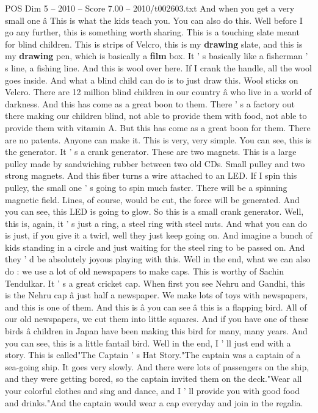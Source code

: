 \begin{textsample}{POS Dim 5 – 2010 – Score 7.00 – 2010/t002603.txt}
And when you get a very small one â This is what the kids teach you.
You can also do this.
Well before I go any further, this is something worth sharing.
This is a touching slate meant for blind children.
This is strips of Velcro, this is my \textbf{drawing} slate, and this is my \textbf{drawing} pen, which is basically a \textbf{film} box.
It ' s basically like a fisherman ' s line, a fishing line.
And this is wool over here.
If I crank the handle, all the wool goes inside.
And what a blind child can do is to just draw this.
Wool sticks on Velcro.
There are 12 million blind children in our country â who live in a world of darkness.
And this has come as a great boon to them.
There ' s a factory out there making our children blind, not able to provide them with food, not able to provide them with vitamin A.
But this has come as a great boon for them.
There are no patents.
Anyone can make it.
This is very, very simple.
You can see, this is the generator.
It ' s a crank generator.
These are two magnets.
This is a large pulley made by sandwiching rubber between two old CDs.
Small pulley and two strong magnets.
And this fiber turns a wire attached to an LED.
If I spin this pulley, the small one ' s going to spin much faster.
There will be a spinning magnetic field.
Lines, of course, would be cut, the force will be generated.
And you can see, this LED is going to glow.
So this is a small crank generator.
Well, this is, again, it ' s just a ring, a steel ring with steel nuts.
And what you can do is just, if you give it a twirl, well they just keep going on.
And imagine a bunch of kids standing in a circle and just waiting for the steel ring to be passed on.
And they ' d be absolutely joyous playing with this.
Well in the end, what we can also do : we use a lot of old newspapers to make caps.
This is worthy of Sachin Tendulkar.
It ' s a great cricket cap.
When first you see Nehru and Gandhi, this is the Nehru cap â just half a newspaper.
We make lots of toys with newspapers, and this is one of them.
And this is â you can see â this is a flapping bird.
All of our old newspapers, we cut them into little squares.
And if you have one of these birds â children in Japan have been making this bird for many, many years.
And you can see, this is a little fantail bird.
Well in the end, I ' ll just end with a story.
This is called"The Captain ' s Hat Story."The captain was a captain of a sea-going ship.
It goes very slowly.
And there were lots of passengers on the ship, and they were getting bored, so the captain invited them on the deck."Wear all your colorful clothes and sing and dance, and I ' ll provide you with good food and drinks."And the captain would wear a cap everyday and join in the regalia.

\end{textsample}
